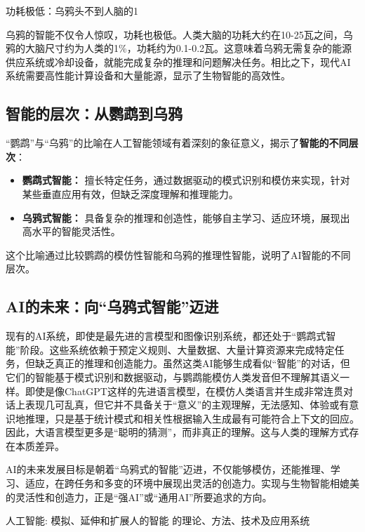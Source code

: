 功耗极低：乌鸦头不到人脑的1%

乌鸦的智能不仅令人惊叹，功耗也极低。人类大脑的功耗大约在10-25瓦之间，乌鸦的大脑尺寸约为人类的1\%，功耗约为0.1-0.2瓦。这意味着乌鸦无需复杂的能源供应系统或冷却设备，就能完成复杂的推理和问题解决任务。相比之下，现代AI系统需要高性能计算设备和大量能源，显示了生物智能的高效性。

\subsection*{智能的层次：从鹦鹉到乌鸦}
“鹦鹉”与“乌鸦”的比喻在人工智能领域有着深刻的象征意义，揭示了{\bf 智能的不同层次}：
\begin{itemize}
\item {\bf 鹦鹉式智能：} 擅长特定任务，通过数据驱动的模式识别和模仿来实现，针对某些垂直应用有效，但缺乏深度理解和推理能力。
\item {\bf 乌鸦式智能：} 具备复杂的推理和创造性，能够自主学习、适应环境，展现出高水平的智能灵活性。
\end{itemize}

这个比喻通过比较鹦鹉的模仿性智能和乌鸦的推理性智能，说明了AI智能的不同层次。

\subsection*{AI的未来：向“乌鸦式智能”迈进}
现有的AI系统，即使是最先进的言模型和图像识别系统，都还处于“鹦鹉式智能”阶段。这些系统依赖于预定义规则、大量数据、大量计算资源来完成特定任务，但缺乏真正的推理和创造能力。虽然这类AI能够生成看似“智能”的对话，但它们的智能基于模式识别和数据驱动，与鹦鹉能模仿人类发音但不理解其语义一样。即使是像ChatGPT这样的先进语言模型，在模仿人类语言并生成非常连贯对话上表现几可乱真，但它并不具备关于“意义”的主观理解，无法感知、体验或有意识地推理，只是基于统计模式和相关性根据输入生成最有可能符合上下文的回应。因此，大语言模型更多是“聪明的猜测”，而非真正的理解。这与人类的理解方式存在本质差异。


AI的未来发展目标是朝着“乌鸦式的智能”迈进，不仅能够模仿，还能推理、学习、适应，在跨任务和多变的环境中展现出灵活的创造力。实现与生物智能相媲美的灵活性和创造力，正是“强AI”或“通用AI”所要追求的方向。


人工智能:		模拟、延伸和扩展人的智能   的理论、方法、技术及应用系统


\nocite{*}

\newpage
